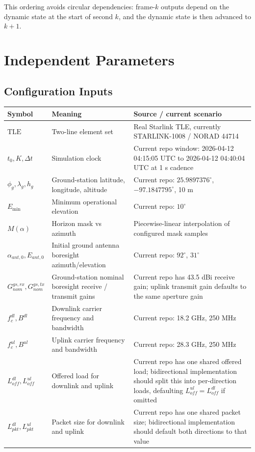 \documentclass[11pt]{article}
\begin{document}
This ordering avoids circular dependencies: frame-$k$ outputs depend on the dynamic state
at the start of second $k$, and the dynamic state is then advanced to $k+1$.

\section{Independent Parameters}

\subsection{Configuration Inputs}

\begin{longtable}{p{} p{} p{}}
\toprule
Symbol & Meaning & Source / current scenario \\
\midrule
\endhead
$\mathrm{TLE}$ & Two-line element set & Real Starlink TLE, currently STARLINK-1008 / NORAD 44714 \\
$t_0, K, \Delta t$ & Simulation clock & Current repo window: 2026-04-12 04:15:05 UTC to 2026-04-12 04:40:04 UTC at 1 s cadence \\
$\phi_g, \lambda_g, h_g$ & Ground-station latitude, longitude, altitude & Current repo: $25.9897376^\circ$, $-97.1847795^\circ$, 10 m \\
$E_{\min}$ & Minimum operational elevation & Current repo: $10^\circ$ \\
$M(\alpha)$ & Horizon mask vs azimuth & Piecewise-linear interpolation of configured mask samples \\
$\alpha_{ant,0}, E_{ant,0}$ & Initial ground antenna boresight azimuth/elevation & Current repo: $92^\circ$, $31^\circ$ \\
$G^{gs,rx}_{nom}, G^{gs,tx}_{nom}$ & Ground-station nominal boresight receive / transmit gains & Current repo has 43.5 dBi receive gain; uplink transmit gain defaults to the same aperture gain \\
$f_c^{dl}, B^{dl}$ & Downlink carrier frequency and bandwidth & Current repo: 18.2 GHz, 250 MHz \\
$f_c^{ul}, B^{ul}$ & Uplink carrier frequency and bandwidth & Current repo: 28.3 GHz, 250 MHz \\
$L^{dl}_{off}, L^{ul}_{off}$ & Offered load for downlink and uplink & Current repo has one shared offered load; bidirectional implementation should split this into per-direction loads, defaulting $L^{ul}_{off}=L^{dl}_{off}$ if omitted \\
$L^{dl}_{pkt}, L^{ul}_{pkt}$ & Packet size for downlink and uplink & Current repo has one shared packet size; bidirectional implementation should default both directions to that value \\

\end{longtable}
\end{document}
